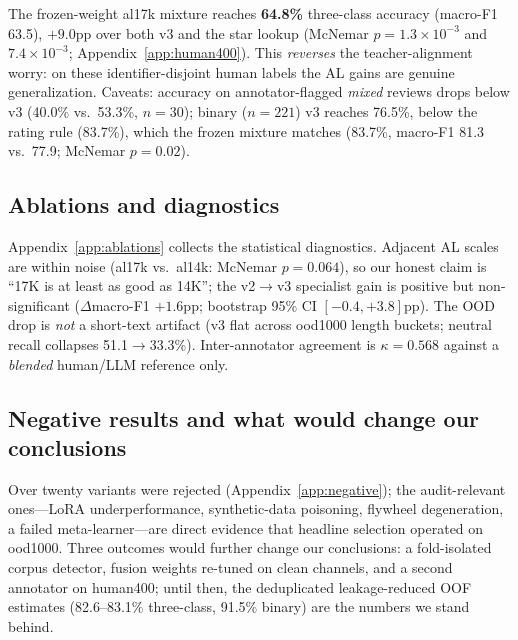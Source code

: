 The frozen-weight al17k mixture reaches \textbf{64.8\%} three-class
accuracy (macro-F1 63.5), $+9.0$pp over both v3 and the star lookup
(McNemar $p{=}1.3{\times}10^{-3}$ and $7.4{\times}10^{-3}$;
Appendix~\ref{app:human400}). This \emph{reverses} the teacher-alignment
worry: on these identifier-disjoint human labels the AL gains are
genuine generalization. Caveats: accuracy on annotator-flagged
\emph{mixed} reviews drops below v3 (40.0\% vs.\ 53.3\%, $n{=}30$);
binary ($n{=}221$) v3 reaches 76.5\%, below the rating rule (83.7\%),
which the frozen mixture matches (83.7\%, macro-F1 81.3 vs.\ 77.9;
McNemar $p{=}0.02$).

\subsection{Ablations and diagnostics}
\label{sec:res-ablations}

Appendix~\ref{app:ablations} collects the statistical diagnostics.
Adjacent AL scales are within noise (al17k vs.\ al14k: McNemar
$p{=}0.064$), so our honest claim is ``17K is at least as good as
14K''; the v2$\to$v3 specialist gain is positive but non-significant
($\Delta$macro-F1 $+1.6$pp; bootstrap 95\% CI $[-0.4,+3.8]$pp). The
OOD drop is \emph{not} a short-text artifact (v3 flat across ood1000
length buckets; neutral recall collapses 51.1$\to$33.3\%).
Inter-annotator agreement is $\kappa{=}0.568$ against a \emph{blended}
human/LLM reference only.

\subsection{Negative results and what would change our conclusions}
\label{sec:res-negative}

Over twenty variants were rejected (Appendix~\ref{app:negative}); the
audit-relevant ones---LoRA underperformance, synthetic-data poisoning,
flywheel degeneration, a failed meta-learner---are direct evidence
that headline selection operated on
ood1000. Three outcomes would further change our conclusions: a
fold-isolated corpus detector, fusion weights re-tuned on clean
channels, and a second annotator on human400; until then, the
deduplicated leakage-reduced OOF estimates (82.6--83.1\% three-class,
91.5\% binary) are the numbers we stand behind.
